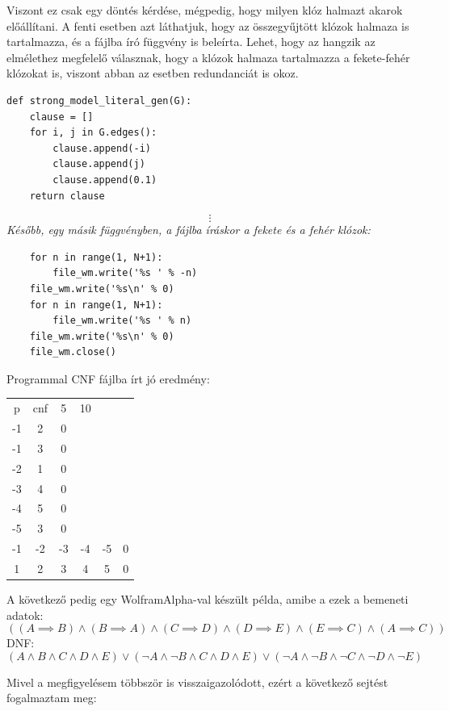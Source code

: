 \documentclass[
]{thesis-ekf}
\theoremstyle{definition}
\theoremstyle{remark}
\begin{document}
	Viszont ez csak egy döntés kérdése, mégpedig, hogy milyen klóz halmazt akarok előállítani. A fenti esetben azt láthatjuk, hogy az összegyűjtött klózok halmaza is tartalmazza, és a fájlba író függvény is beleírta. Lehet, hogy az hangzik az elmélethez megfelelő válasznak, hogy a klózok halmaza tartalmazza a fekete-fehér klózokat is, viszont abban az esetben redundanciát is okoz.
	
	
	
	\begin{lstlisting}
def strong_model_literal_gen(G):
	clause = []
	for i, j in G.edges():
		clause.append(-i)
		clause.append(j)
		clause.append(0.1)
	return clause	
	\end{lstlisting}
\begin{equation*}\label{v}
	\vdots
\end{equation*}
\emph{Később, egy másik függvényben, a fájlba íráskor a fekete és a fehér klózok:}
	\begin{lstlisting}
	for n in range(1, N+1):
		file_wm.write('%s ' % -n)
	file_wm.write('%s\n' % 0)
	for n in range(1, N+1):
		file_wm.write('%s ' % n)
	file_wm.write('%s\n' % 0)
	file_wm.close()
	\end{lstlisting}	
	
	Programmal \textsc{CNF} fájlba írt jó eredmény:

	\begin{tabular}{cccccc}
		p & cnf & 5 & 10 & &   \\
		-1&  2 &  0&   &   &   \\
		-1&  3 &  0&   &   &   \\
		-2&  1 &  0&   &   &   \\
		-3&  4 &  0&   &   &   \\
		-4&  5 &  0&   &   &   \\
		-5&  3 &  0&   &   &   \\
		-1& -2 & -3& -4& -5& 0 \\
		1&  2 &  3&  4&  5& 0 \\
	\end{tabular}

	A következő pedig egy WolframAlpha-val készült példa, amibe a ezek a bemeneti adatok:
	\[ ((A\implies B)\wedge(B\implies A)\wedge(C\implies D)\wedge(D\implies E)\wedge(E\implies C)\wedge(A\implies C)) \]
	\textsc{DNF}:
	\[ (A\wedge B\wedge C\wedge D\wedge E)\vee (\neg A\wedge\neg B\wedge C\wedge D\wedge E)\vee (\neg A\wedge\neg B\wedge\neg C\wedge\neg D\wedge\neg E) \]
	
	Mivel a megfigyelésem többször is visszaigazolódott, ezért a következő sejtést fogalmaztam meg:
	
\end{document}
